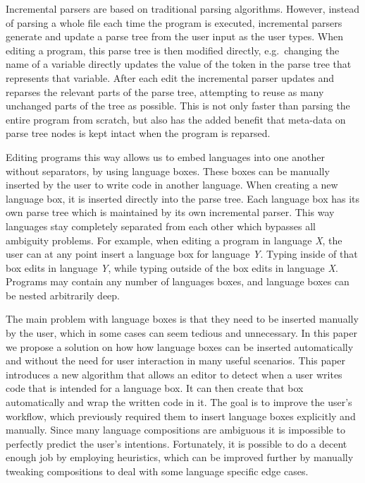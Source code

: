 \documentclass[sigplan,screen]{acmart}\settopmatter{printfolios=true,printccs=false,printacmref=false}
\begin{document}
Incremental parsers are based on traditional parsing algorithms. However,
instead of parsing a whole file each time the program is executed, incremental
parsers generate and update a parse tree from the user input as the user types.
When editing a program, this parse tree is then modified directly,
e.g.~changing the name of a variable directly updates the value of the token in
the parse tree that represents that variable. After each edit the incremental
parser updates and reparses the relevant parts of the parse tree, attempting to
reuse as many unchanged parts of the tree as possible. This is not only faster
than parsing the entire program from scratch, but also has the added benefit
that meta-data on parse tree nodes is kept intact when the program is reparsed.

Editing programs this way allows us to embed languages into one another without
separators, by using language boxes. These boxes can be manually inserted by
the user to write code in another language. When creating a new language box,
it is inserted directly into the parse tree. Each language box has its own
parse tree which is maintained by its own incremental parser. This way
languages stay completely separated from each other which bypasses all
ambiguity problems. For example, when editing a program in language \emph{X},
the user can at any point insert a language box for language \emph{Y}. Typing
inside of that box edits in language \emph{Y}, while typing outside of the box
edits in language \emph{X}. Programs may contain any number of languages
boxes, and language boxes can be nested arbitrarily deep.

The main problem with language boxes is that they need to be inserted manually
by the user, which in some cases can seem tedious and unnecessary. In this
paper we propose a solution on how how language boxes can be inserted
automatically and without the need for user interaction in many useful
scenarios. This paper introduces a new algorithm that allows an editor to
detect when a user writes code that is intended for a language box. It can then
create that box automatically and wrap the written code in it. The goal is to
improve the user's workflow, which previously required them to insert language
boxes explicitly and manually.  Since many language compositions are ambiguous
it is impossible to perfectly predict the user's intentions. Fortunately, it is
possible to do a decent enough job by employing heuristics, which can be
improved further by manually tweaking compositions to deal with some language
specific edge cases.
\end{document}
